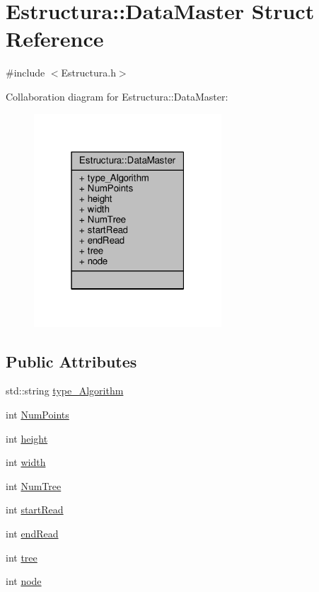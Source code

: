 \hypertarget{structEstructura_1_1DataMaster}{}\section{Estructura\+:\+:Data\+Master Struct Reference}
\label{structEstructura_1_1DataMaster}


{\ttfamily \#include $<$Estructura.\+h$>$}



Collaboration diagram for Estructura\+:\+:Data\+Master\+:
\nopagebreak
\begin{figure}[H]
\begin{center}
\leavevmode
\includegraphics[width=199pt]{structEstructura_1_1DataMaster__coll__graph}
\end{center}
\end{figure}
\subsection*{Public Attributes}
\begin{DoxyCompactItemize}
\item 
std\+::string \hyperlink{structEstructura_1_1DataMaster_accae7ba56def5fd845b33cb8cfb384fe}{type\+\_\+\+Algorithm}
\item 
int \hyperlink{structEstructura_1_1DataMaster_ad62760f62256a3fbd88481f720b81851}{Num\+Points}
\item 
int \hyperlink{structEstructura_1_1DataMaster_a33df1604c867e22af955f29c453d6651}{height}
\item 
int \hyperlink{structEstructura_1_1DataMaster_a52e88b0d0d52d7e61880e3689ef2e638}{width}
\item 
int \hyperlink{structEstructura_1_1DataMaster_a950938f474870649fe7eceae940366fd}{Num\+Tree}
\item 
int \hyperlink{structEstructura_1_1DataMaster_ada49eb1401a3715858043ebd2b61c10c}{start\+Read}
\item 
int \hyperlink{structEstructura_1_1DataMaster_a787807eccc80c8e639d2409477f37f3a}{end\+Read}
\item 
int \hyperlink{structEstructura_1_1DataMaster_a766b1b437e0f242d3626a3759bef8b43}{tree}
\item 
int \hyperlink{structEstructura_1_1DataMaster_a5b7bf8e1c983ad0a64dd596d1bb4e31a}{node}
\end{DoxyCompactItemize}


